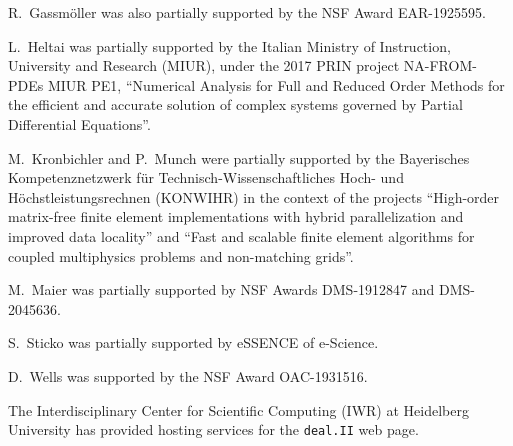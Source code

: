 \documentclass{ansarticle-preprint}
\newcommand{\specialword}[1]{\texttt{#1}}
\newcommand{\dealii}{{\specialword{deal.II}}\xspace}
\begin{document}
R.~Gassm{\"o}ller was also partially supported by the NSF Award
EAR-1925595.

L.~Heltai was partially supported by the Italian Ministry of Instruction,
University and Research (MIUR), under the 2017 PRIN project NA-FROM-PDEs MIUR
PE1, ``Numerical Analysis for Full and Reduced Order Methods for the efficient
and accurate solution of complex systems governed by Partial Differential
Equations''.

M.~Kronbichler and P.~Munch were partially supported by the
Bayerisches Kompetenznetzwerk
f\"ur Technisch-Wissen\-schaft\-li\-ches Hoch- und H\"ochstleistungsrechnen
(KONWIHR) in the context of the projects
``High-order matrix-free finite element implementations with
hybrid parallelization and improved data locality'' and ``Fast and scalable finite element algorithms for coupled multiphysics problems and non-matching grids''.

M.~Maier was partially supported by NSF Awards DMS-1912847 and DMS-2045636.

S.~Sticko was partially supported by eSSENCE of e-Science.

D.~Wells was supported by the NSF Award OAC-1931516.

The Interdisciplinary Center for Scientific Computing (IWR) at Heidelberg
University has provided hosting services for the \dealii{} web page.

{}

\end{document}
